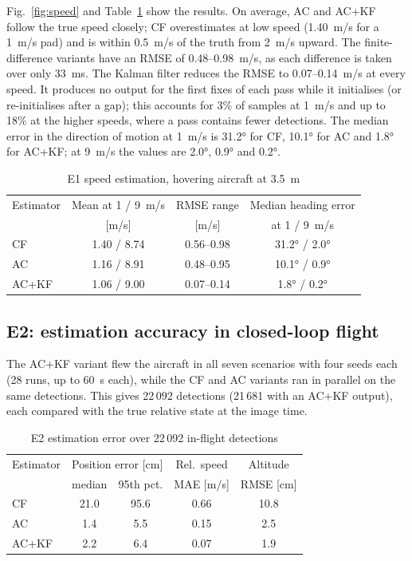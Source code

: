 \documentclass[conference]{IEEEtran}
\begin{document}
Fig.~\ref{fig:speed} and Table~\ref{tab:speed} show the results. On average, AC and AC+KF
follow the true speed closely; CF overestimates at low speed (\SI{1.40}{m/s} for a
\SI{1}{m/s} pad) and is within \SI{0.5}{m/s} of the truth from \SI{2}{m/s} upward. The
finite-difference variants have an RMSE of
0.48--\SI{0.98}{m/s}, as each difference is taken over only \SI{33}{ms}. The Kalman filter
reduces the RMSE to 0.07--\SI{0.14}{m/s} at every speed. It produces no output for the first
fixes of each pass while it initialises (or re-initialises after a gap); this accounts for 3\% of samples at \SI{1}{m/s} and
up to 18\% at the higher speeds, where a pass contains fewer detections. The median error in
the direction of motion at \SI{1}{m/s} is \ang{31.2} for CF, \ang{10.1} for AC and \ang{1.8}
for AC+KF; at \SI{9}{m/s} the values are \ang{2.0}, \ang{0.9} and \ang{0.2}.

\begin{table}[t]
\centering
\caption{E1 speed estimation, hovering aircraft at \SI{3.5}{m}}
\label{tab:speed}
\footnotesize
\setlength{\tabcolsep}{2.5pt}
\begin{tabular}{@{}lccc@{}}
\toprule
Estimator & Mean at 1 / \SI{9}{m/s} & RMSE range & Median heading error \\
& [m/s] & [m/s] & at 1 / \SI{9}{m/s} \\
\midrule
CF & 1.40 / 8.74 & 0.56--0.98 & \ang{31.2} / \ang{2.0} \\
AC & 1.16 / 8.91 & 0.48--0.95 & \ang{10.1} / \ang{0.9} \\
AC+KF & 1.06 / 9.00 & 0.07--0.14 & \ang{1.8} / \ang{0.2} \\
\bottomrule
\end{tabular}
\end{table}

\subsection{E2: estimation accuracy in closed-loop flight}
The AC+KF variant flew the aircraft in all seven scenarios with four seeds each (28 runs, up
to \SI{60}{s} each), while the CF and AC variants ran in parallel on the same detections. This
gives 22\,092 detections (21\,681 with an AC+KF output), each compared with the true relative state at the image time.

\begin{table}[t]
\centering
\caption{E2 estimation error over 22\,092 in-flight detections}
\label{tab:est}
\begin{tabular}{@{}lcccc@{}}
\toprule
Estimator & \multicolumn{2}{c}{Position error [cm]} & Rel.\ speed & Altitude \\
& median & 95th pct. & MAE [m/s] & RMSE [cm] \\
\midrule
CF & 21.0 & 95.6 & 0.66 & 10.8 \\
AC & 1.4 & 5.5 & 0.15 & 2.5 \\
AC+KF & 2.2 & 6.4 & 0.07 & 1.9 \\
\bottomrule
\end{tabular}
\end{table}
\end{document}

